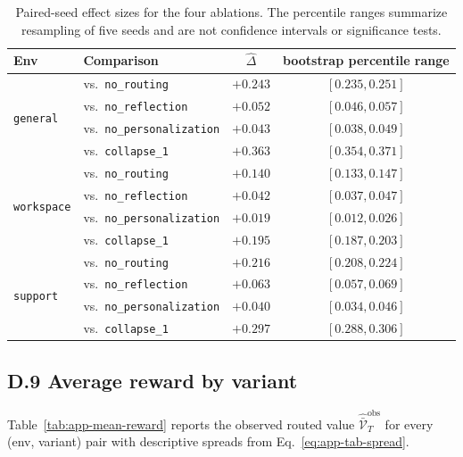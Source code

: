 \documentclass{article} %
\begin{document}
\begin{table}[h]
\centering
\small
\begin{tabular}{llcc}
\toprule
Env & Comparison & $\widehat\Delta$ & bootstrap percentile range \\
\midrule
\multirow{4}{*}{\texttt{general}}
 & vs.\ \texttt{no\_routing}         & $+0.243$ & $[0.235, 0.251]$ \\
 & vs.\ \texttt{no\_reflection}      & $+0.052$ & $[0.046, 0.057]$ \\
 & vs.\ \texttt{no\_personalization} & $+0.043$ & $[0.038, 0.049]$ \\
 & vs.\ \texttt{collapse\_1}         & $+0.363$ & $[0.354, 0.371]$ \\
\midrule
\multirow{4}{*}{\texttt{workspace}}
 & vs.\ \texttt{no\_routing}         & $+0.140$ & $[0.133, 0.147]$ \\
 & vs.\ \texttt{no\_reflection}      & $+0.042$ & $[0.037, 0.047]$ \\
 & vs.\ \texttt{no\_personalization} & $+0.019$ & $[0.012, 0.026]$ \\
 & vs.\ \texttt{collapse\_1}         & $+0.195$ & $[0.187, 0.203]$ \\
\midrule
\multirow{4}{*}{\texttt{support}}
 & vs.\ \texttt{no\_routing}         & $+0.216$ & $[0.208, 0.224]$ \\
 & vs.\ \texttt{no\_reflection}      & $+0.063$ & $[0.057, 0.069]$ \\
 & vs.\ \texttt{no\_personalization} & $+0.040$ & $[0.034, 0.046]$ \\
 & vs.\ \texttt{collapse\_1}         & $+0.297$ & $[0.288, 0.306]$ \\
\bottomrule
\end{tabular}
\caption{Paired-seed effect sizes for the four ablations. The percentile ranges
summarize resampling of five seeds and are not confidence intervals or
significance tests.}
\label{tab:app-bootstrap}
\end{table}

\subsection{D.9 Average reward by variant}

\label{app:tab-reward}

Table~\ref{tab:app-mean-reward} reports the observed routed value
\(\widehat{\bar{\mathcal V}}_T^{\mathrm{obs}}\) for every (env, variant) pair
with descriptive spreads from Eq.~\eqref{eq:app-tab-spread}.
\end{document}
